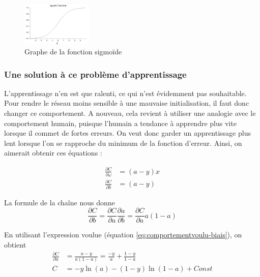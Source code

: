 \begin{figure}[h]
 \centering
 \includegraphics[width=0.3\textwidth]{img/sigmoid_function.png}
 \caption{Graphe de la fonction sigmoïde}
 \label{fig:sigmoid_function}
\end{figure}

\subsubsection{Une solution à ce problème d'apprentissage}
\label{subsubsection:etablissement-eq-entropiecroisee}

L'apprentissage n'en est que ralenti, ce qui n'est évidemment pas souhaitable. Pour rendre le réseau moins sensible à une mauvaise initialisation,
il faut donc changer ce comportement. A nouveau, cela revient à utiliser une analogie avec le comportement humain, puisque l'humain a tendance à apprendre
plus vite lorsque il commet de fortes erreurs. On veut donc garder un apprentissage plus lent lorsque l'on se rapproche du minimum de la fonction
d'erreur. Ainsi, on aimerait obtenir ces équations :

\begin{align}
  \label{eq:comportementvoulu-poids}
  \frac{\partial C}{\partial \omega} &= \left(a-y\right)x \\
  \frac{\partial C}{\partial b} &= \left(a-y\right)
  \label{eq:comportementvoulu-biais}
\end{align}

La formule de la chaîne nous donne 
\begin{equation}
 \frac{\partial C}{\partial b} = \frac{\partial C}{\partial a} \frac{\partial a}{\partial b} = \frac{\partial C}{\partial a} a\left(1-a\right)
\end{equation}

En utilisant l'expression voulue (équation \ref{eq:comportementvoulu-biais}), on obtient 
\begin{align}
 \frac{\partial C}{\partial a} &= \frac{a-y}{a\left(1-a\right)} = \frac{-y}{a} + \frac{1-y}{1-a} \\
 C &= -y\ln\left(a\right) - \left(1-y\right)\ln\left(1-a\right) + Const
\end{align}

